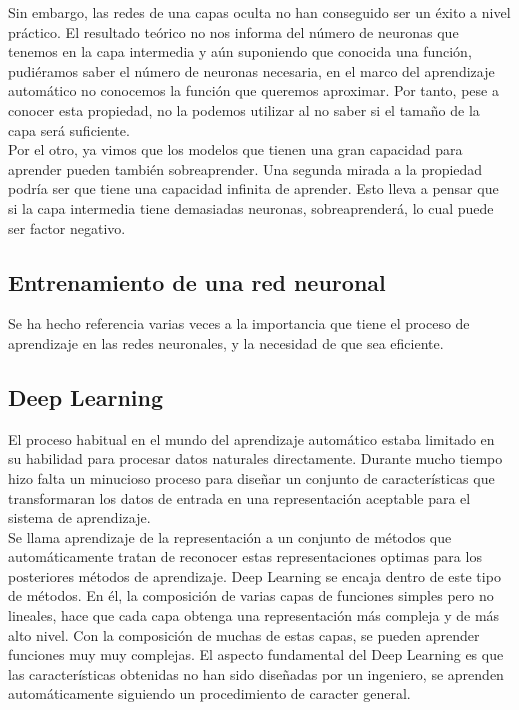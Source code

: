 Sin embargo, las redes de una capas oculta no han conseguido ser un éxito a nivel práctico. El resultado teórico no nos informa del número de neuronas que tenemos en la capa intermedia y aún suponiendo que conocida una función, pudiéramos saber el número de neuronas necesaria, en el marco del aprendizaje automático no conocemos la función que queremos aproximar. Por tanto, pese a conocer esta propiedad, no la podemos utilizar al no saber si el tamaño de la capa será suficiente.\\

Por el otro, ya vimos que los modelos que tienen una gran capacidad para aprender pueden también sobreaprender. Una segunda mirada a la propiedad podría ser que tiene una capacidad infinita de aprender. Esto lleva a pensar que si la capa intermedia tiene demasiadas neuronas, sobreaprenderá, lo cual puede ser factor negativo.\\


\subsection{Entrenamiento de una red neuronal}

Se ha hecho referencia varias veces a la importancia que tiene el proceso de aprendizaje en las redes neuronales, y la necesidad de que sea eficiente.

\subsection{Deep Learning}

El proceso habitual en el mundo del aprendizaje automático estaba limitado en su habilidad para procesar datos naturales directamente. Durante mucho tiempo hizo falta un minucioso proceso para diseñar un conjunto de características que transformaran los datos de entrada en una representación aceptable para el sistema de aprendizaje\cite{lecun-nature}.\\

Se llama aprendizaje de la representación a un conjunto de métodos que automáticamente tratan de reconocer estas representaciones optimas para los posteriores métodos de aprendizaje. Deep Learning se encaja dentro de este tipo de métodos. En él, la composición de varias capas de funciones simples pero no lineales, hace que cada capa obtenga una representación más compleja y de más alto nivel. Con la composición de muchas de estas capas, se pueden aprender funciones muy muy complejas. El aspecto fundamental del Deep Learning es que las características obtenidas no han sido diseñadas por un ingeniero, se aprenden automáticamente siguiendo un procedimiento de caracter general.\\
 
